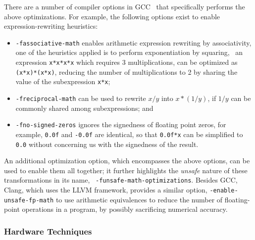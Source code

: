 There are a number of compiler options in GCC~\cite{gcc} that specifically
performs the above optimizations.  For example, the following options exist to
enable expression-rewriting heuristics:
\begin{itemize}

    \item \verb|-fassociative-math| enables arithmetic expression rewriting by
    associativity, one of the heuristics applied is to perform exponentiation
    by squaring, \eg~an expression \verb|x*x*x*x| which requires 3
    multiplications, can be optimized as \verb|(x*x)*(x*x)|, reducing the
    number of multiplications to 2 by sharing the value of the subexpression
    \verb|x*x|;

    \item \verb|-freciprocal-math| can be used to rewrite $x / y$ into $x * (1
    / y)$, if $1 / y$ can be commonly shared among subexpressions; and

    \item \verb|-fno-signed-zeros| ignores the signedness of floating point
    zeros, for example, \verb|0.0f| and \verb|-0.0f| are identical, so that
    \verb|0.0f*x| can be simplified to \verb|0.0| without concerning us with
    the signedness of the result.

\end{itemize}

An additional optimization option, which encompasses the above options,
can be used to enable them all together; it further highlights
the \emph{unsafe} nature of these transformations in its name,
\ie~\verb|-funsafe-math-optimizations|.  Besides GCC, Clang, which uses the
LLVM framework, provides a similar option, \verb|-enable-unsafe-fp-math| to use
arithmetic equivalences to reduce the number of floating-point operations in a
program, by possibly sacrificing numerical accuracy.


\subsubsection{Hardware Techniques}

